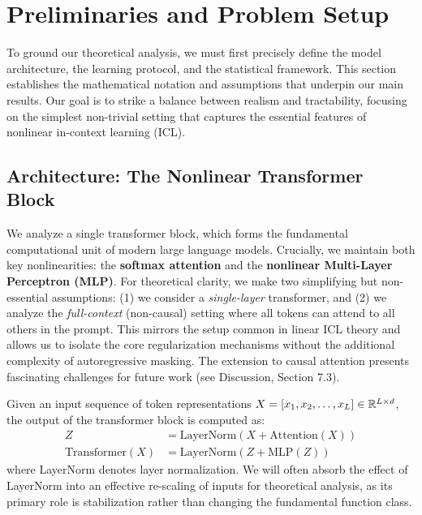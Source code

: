 \section{Preliminaries and Problem Setup}
\label{sec:preliminaries}

To ground our theoretical analysis, we must first precisely define the model architecture, the learning protocol, and the statistical framework. This section establishes the mathematical notation and assumptions that underpin our main results. Our goal is to strike a balance between realism and tractability, focusing on the simplest non-trivial setting that captures the essential features of nonlinear in-context learning (ICL).

\subsection{Architecture: The Nonlinear Transformer Block}
\label{subsec:architecture}

We analyze a single transformer block, which forms the fundamental computational unit of modern large language models. Crucially, we maintain both key nonlinearities: the \textbf{softmax attention} and the \textbf{nonlinear Multi-Layer Perceptron (MLP)}. For theoretical clarity, we make two simplifying but non-essential assumptions: (1) we consider a \textit{single-layer} transformer, and (2) we analyze the \textit{full-context} (non-causal) setting where all tokens can attend to all others in the prompt. This mirrors the setup common in linear ICL theory and allows us to isolate the core regularization mechanisms without the additional complexity of autoregressive masking. The extension to causal attention presents fascinating challenges for future work (see Discussion, Section 7.3).

\begin{definition}
	Given an input sequence of token representations \( X = [x_1, x_2, \dots, x_L] \in \mathbb{R}^{L \times d} \), the output of the transformer block is computed as:
	\begin{align}
		Z &= \text{LayerNorm}(X + \text{Attention}(X)) \label{eq:attn_residual} \\
		\text{Transformer}(X) &= \text{LayerNorm}(Z + \text{MLP}(Z)) \label{eq:mlp_residual}
	\end{align}
	where LayerNorm denotes layer normalization. We will often absorb the effect of LayerNorm into an effective re-scaling of inputs for theoretical analysis, as its primary role is stabilization rather than changing the fundamental function class.
\end{definition}

